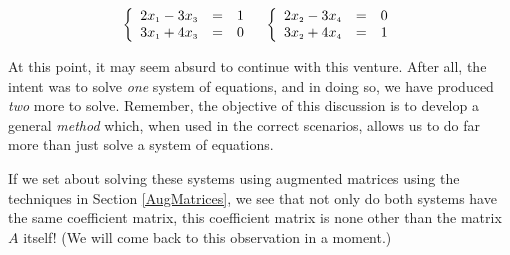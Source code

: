 \documentclass{ximera}
\begin{document}
\[\begin{array}{cc}

\left\{ \begin{array}{rcr} 2x_{\mbox{\tiny$1$}}-3x_{\mbox{\tiny$3$}} & = & 1 \\ 3x_{\mbox{\tiny$1$}}+4x_{\mbox{\tiny$3$}} & = & 0 \\ \end{array} \right.

&

\left\{ \begin{array}{rcr} 2x_{\mbox{\tiny$2$}}-3x_{\mbox{\tiny$4$}} & = & 0 \\ 3x_{\mbox{\tiny$2$}}+4x_{\mbox{\tiny$4$}} & = & 1 \\ \end{array} \right.

\end{array}\]

At this point, it may seem absurd to continue with this venture.  After all, the intent was to solve \textit{one} system of equations, and in doing so, we have produced \textit{two} more to solve.  Remember, the objective of this discussion is to develop a general \textit{method} which, when used in the correct scenarios, allows us to do far more than just solve a system of equations. 

 If we set about solving these systems using augmented matrices using the techniques in Section \ref{AugMatrices}, we see that not only do both systems have the same coefficient matrix, this coefficient matrix is none other than the matrix $A$ itself!  (We will come back to this observation in a moment.)  
\end{document}
